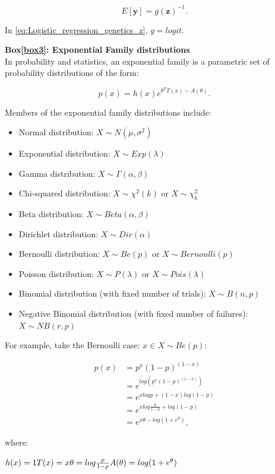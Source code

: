 \begin{equation*}
 E[\mathbf{y}] = g(\mathbf{z})^{-1}. 
\end{equation*}

In \eqref{eq:Logistic_regression_genetics_z}, $ g = logit $.



\newpage

\begin{Comment}
\hspace{-2.5mm}\textbf{Box\ref{box3}: Exponential Family distributions}\label{box3}\\
In probability and statistics, an exponential family is a parametric set of probability distributions of the form:

\begin{equation*}
    p(x) = h(x)e^{\theta^TT(x)-A(\theta)}.
\end{equation*}

Members of the exponential family distributions include:
\begin{itemize}
    \item Normal distribution: $X \sim N(\mu,\sigma^2)$
    \item Exponential distribution: $ X \sim Exp(\lambda)$
    \item Gamma distribution: $ X \sim \Gamma(\alpha,\beta)$
    \item Chi-squared distribution: $ X \sim \chi^2 (k)$ or $ X \sim \chi_k^2$
    \item Beta distribution: $ X \sim Beta(\alpha,\beta)$
    \item Dirichlet distribution: $ X \sim Dir(\alpha)$
    \item Bernoulli distribution: $ X \sim Be(p)$ or $ X \sim Bernoulli(p)$
    \item Poisson distribution: $ X \sim P(\lambda)$ or $ X \sim Pois(\lambda)$
    \item Binomial distribution (with fixed number of trials): $ X \sim B(n,p)$
    \item Negative Binomial distribution (with fixed number of failures): $ X \sim NB(r,p)$\\
\end{itemize}

For example, take the Bernoulli case: $x \in X \sim Be(p)$:

\begin{equation*}
\begin{split}
    p(x) & = p^x(1-p)^{(1-x)}\\
         & = e^{log(p^x(1-p)^{(1-x)})}\\
         & = e^{xlogp + (1-x)log(1-p)}\\
         & = e^{xlog\frac{p}{1-p}+log(1-p)}\\
         & = e^{x\theta - log(1+e^\theta)},
\end{split}
\end{equation*}

where: 

\hfill $h(x)=1 \hfill T(x)=x \hfill \theta = log \frac{p}{1-p} \hfill A(\theta) = log(1+e^\theta)$ \hfill

\end{Comment}


